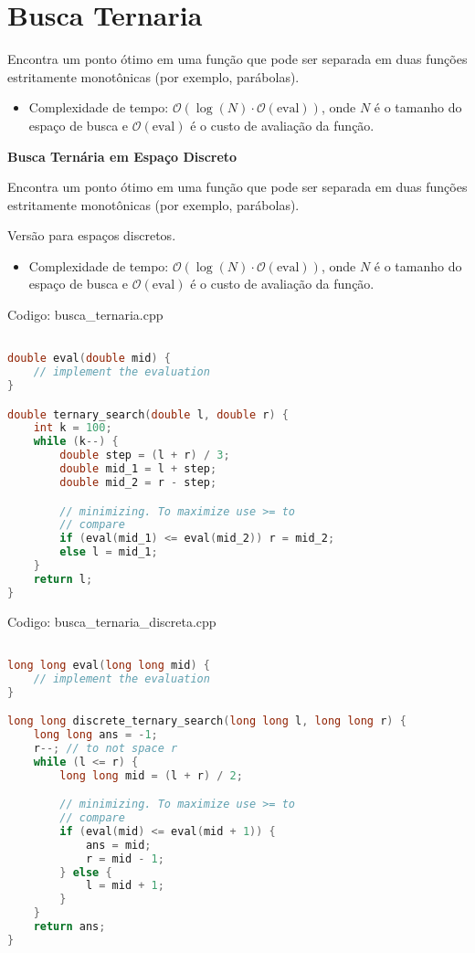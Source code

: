 \documentclass[10pt, a4paper, oneside]{book}
\begin{document}
\section{Busca Ternaria}


Encontra um ponto ótimo em uma função que pode ser separada em duas funções estritamente monotônicas (por exemplo, parábolas).



\begin{itemize}
\item Complexidade de tempo: $\mathcal{O}(\log(N) \cdot \mathcal{O}(\text{eval}))$, onde \(N\) é o tamanho do espaço de busca e \(\mathcal{O}(\text{eval})\) é o custo de avaliação da função.
\end{itemize}



\textbf{Busca Ternária em Espaço Discreto} 



Encontra um ponto ótimo em uma função que pode ser separada em duas funções estritamente monotônicas (por exemplo, parábolas).

Versão para espaços discretos.



\begin{itemize}
\item Complexidade de tempo: $\mathcal{O}(\log(N) \cdot \mathcal{O}(\text{eval}))$, onde \(N\) é o tamanho do espaço de busca e \(\mathcal{O}(\text{eval})\) é o custo de avaliação da função.
\end{itemize}

\hfill

Codigo: busca\_ternaria.cpp

\begin{lstlisting}[language=C++]

double eval(double mid) {
    // implement the evaluation
}

double ternary_search(double l, double r) {
    int k = 100;
    while (k--) {
        double step = (l + r) / 3;
        double mid_1 = l + step;
        double mid_2 = r - step;

        // minimizing. To maximize use >= to
        // compare
        if (eval(mid_1) <= eval(mid_2)) r = mid_2;
        else l = mid_1;
    }
    return l;
}
\end{lstlisting}
\hfill

Codigo: busca\_ternaria\_discreta.cpp

\begin{lstlisting}[language=C++]

long long eval(long long mid) {
    // implement the evaluation
}

long long discrete_ternary_search(long long l, long long r) {
    long long ans = -1;
    r--; // to not space r
    while (l <= r) {
        long long mid = (l + r) / 2;

        // minimizing. To maximize use >= to
        // compare
        if (eval(mid) <= eval(mid + 1)) {
            ans = mid;
            r = mid - 1;
        } else {
            l = mid + 1;
        }
    }
    return ans;
}
\end{lstlisting}
\hfill
\end{document}
